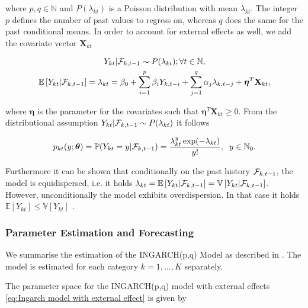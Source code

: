 where $p,q \in \mathbb{N}$ and $P(\lambda_{kt})$ is a Poisson distribution with mean $\lambda_{kt}$. The integer $p$ defines the number of past values to regress on, whereas $q$ does the same for the past conditional means. In order to account for external effects as well, we add the covariate vector $\textbf{X}_{kt}$

\begin{equation}
\begin{gathered}
\label{eq:Ingarch model with external effect}
Y_{kt} | \mathcal{F}_{k,t-1} \sim P(\lambda_{kt}); \forall t \in \mathbb{N}, \\
\mathbb{E}\left[Y_{kt} | \mathcal{F}_{k,t-1} \right] = \lambda_{kt} = \beta_0 + \sum_{i=1}^p\beta_i Y_{k,t-i} + \sum_{j=1}^q\alpha_j \lambda_{k,t-j} + \bm{\eta}^T\textbf{X}_{kt},
\end{gathered}
\end{equation}

where $\bm{\eta}$ is the parameter for the covariates such that $\bm{\eta}^T\textbf{X}_{kt} \geq 0$.
From the distributional assumption $Y_{kt} | \mathcal{F}_{k,t-1} \sim P(\lambda_{kt})$ it follows

\begin{equation}
p_{kt}(y;\bm{\theta})=\mathbb{P}(Y_{kt}=y | \mathcal{F}_{k,t-1}) = \frac{\lambda_{kt}^y \exp(-\lambda_{kt})}{y!}, \hspace{0.2cm} y \in \mathbb{N}_0.
\label{eq:Ingarch Distribution}
\end{equation}

Furthermore it can be shown that conditionally on the past history $\mathcal{F}_{k,t-1}$, the model is equidispersed, i.e. it holds $\lambda_{kt} = \mathbb{E}\left[Y_{kt} | \mathcal{F}_{k,t-1}\right] = \mathbb{V}\left[Y_{kt} | \mathcal{F}_{k,t-1}\right]$. However, unconditionally the model exhibits overdispersion. In that case it holds $\mathbb{E}\left[Y_{kt}\right] \leq \mathbb{V}\left[Y_{kt}\right] $ \cite{Heinen:2003}. 

\subsubsection{Parameter Estimation and Forecasting}
\label{sec: Estimation of the Ingarch Model}

We summarise the estimation of the INGARCH(p,q) Model as described in \cite{Liboschik:2016}. The model is estimated for each category $k=1,\ldots,K$ separately. 

The parameter space for the INGARCH(p,q) model with external effects \ref{eq:Ingarch model with external effect} is given by 


